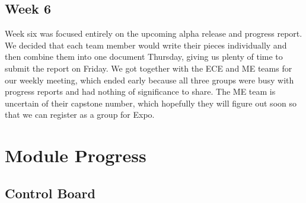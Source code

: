 \documentclass[10pt,letterpaper,onecolumn,draftclsnofoot,journal]{IEEEtran}
\begin{document}
\subsection{Week 6}
Week six was focused entirely on the upcoming alpha release and progress report. We decided that each team member would write their pieces individually and then combine them into one document Thursday, giving us plenty of time to submit the report on Friday. We got together with the ECE and ME teams for our weekly meeting, which ended early because all three groups were busy with progress reports and had nothing of significance to share. The ME team is uncertain of their capstone number, which hopefully they will figure out soon so that we can register as a group for Expo.

\section{Module Progress}
\subsection{Control Board}



%
%
\end{document}

